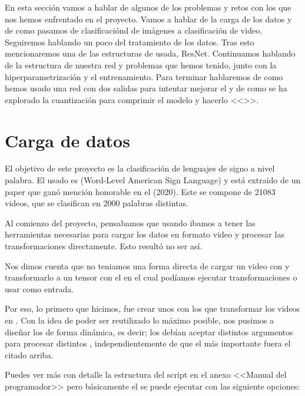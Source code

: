 
En esta sección vamos a hablar de algunos de los problemas y retos con los que nos hemos enfrentado en el proyecto. Vamos a hablar de la carga de los datos y de como pasamos de clasificaciónd de imágenes a clasificación de video. Seguiremos hablando un poco del tratamiento de los datos. Tras esto mencionaremos una de las estructuras de  usada, ResNet. Continuamos hablando de la estructura de nuestra red y problemas que hemos tenido, junto con la hiperparametrización y el entrenamiento. Para terminar hablaremos de como hemos usado una red con dos salidas para intentar mejorar el  y de como se ha explorado la cuantización para comprimir el modelo y hacerlo <<>>.

\section{Carga de datos}

El objetivo de este proyecto es la clasificación de lenguajes de signo a nivel palabra. El  usado  es  (Word-Level American Sign Language) y está extraido de un paper que ganó mención honorable en el  (2020). Este  se compone de 21083 videos, que se clasifican en 2000 palabras distintas.

Al comienzo del proyecto, pensabamos que usando  ibamos a tener las herramientas necesarias para cargar los datos en formato video y procesar las transformaciones directamente. Esto resultó no ser así.

Nos dimos cuenta que no teniamos una forma directa de cargar un video con  y transformarlo a un tensor con el en el cual podíamos ejecutar transformaciones o usar como entrada.

Por eso, lo primero que hicimos, fue crear unos  con los que transformar los videos en . Con la idea de poder ser reutilizado lo máximo posible, nos pusimos a diseñar los  de forma dinámica, es decir; los  debían aceptar distintos argumentos para procesar distintos , independientemente de que el más importante fuera el citado arriba.

Puedes ver más con detalle la estructura del script en el anexo <<Manual del programador>> pero básicamente el  se puede ejecutar con las siguiente opciones:

